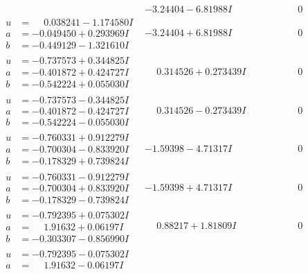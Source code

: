 \documentclass[1p]{elsarticle_modified}
\theoremstyle{definition}
\begin{document}
$$\begin{array}{c|c|c}
 & -3.24404 - 6.81988 I & \phantom{-0.000000 } 0 \\ \hline\begin{aligned}
u &= \phantom{-}0.038241 - 1.174580 I \\
a &= -0.049450 + 0.293969 I \\
b &= -0.449129 - 1.321610 I\end{aligned}
 & -3.24404 + 6.81988 I & \phantom{-0.000000 } 0 \\ \hline\begin{aligned}
u &= -0.737573 + 0.344825 I \\
a &= -0.401872 + 0.424727 I \\
b &= -0.542224 + 0.055030 I\end{aligned}
 & \phantom{-}0.314526 + 0.273439 I & \phantom{-0.000000 } 0 \\ \hline\begin{aligned}
u &= -0.737573 - 0.344825 I \\
a &= -0.401872 - 0.424727 I \\
b &= -0.542224 - 0.055030 I\end{aligned}
 & \phantom{-}0.314526 - 0.273439 I & \phantom{-0.000000 } 0 \\ \hline\begin{aligned}
u &= -0.760331 + 0.912279 I \\
a &= -0.700304 - 0.833920 I \\
b &= -0.178329 + 0.739824 I\end{aligned}
 & -1.59398 - 4.71317 I & \phantom{-0.000000 } 0 \\ \hline\begin{aligned}
u &= -0.760331 - 0.912279 I \\
a &= -0.700304 + 0.833920 I \\
b &= -0.178329 - 0.739824 I\end{aligned}
 & -1.59398 + 4.71317 I & \phantom{-0.000000 } 0 \\ \hline\begin{aligned}
u &= -0.792395 + 0.075302 I \\
a &= \phantom{-}1.91632 + 0.06197 I \\
b &= -0.303307 - 0.856990 I\end{aligned}
 & \phantom{-}0.88217 + 1.81809 I & \phantom{-0.000000 } 0 \\ \hline\begin{aligned}
u &= -0.792395 - 0.075302 I \\
a &= \phantom{-}1.91632 - 0.06197 I \\

\end{aligned}
\end{array}$$
\end{document}

